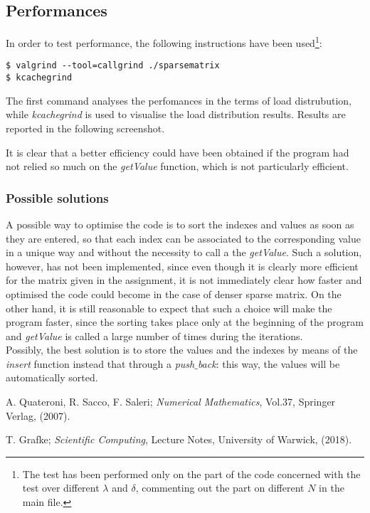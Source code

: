 \documentclass[11pt]{article}
\theoremstyle{theorem}
\theoremstyle{definition}
\begin{document}
\subsection{Performances}
\label{subsec:perf}
In order to test performance, the following instructions have been used\footnote{The test has been performed only on the part of the code concerned with the test over different $\lambda$ and $\delta$, commenting out the part on different $N$ in the main file. }:
\begin{verbatim}
$ valgrind --tool=callgrind ./sparsematrix
$ kcachegrind
\end{verbatim}

The first command analyses the perfomances in the terms of load distrubution, while \emph{kcachegrind} is used to visualise the load distribution results. Results are reported in the following screenshot.


It is clear that a better efficiency could have been obtained if the program had not relied so much on the \emph{getValue} function, which is not particularly efficient.\\

\subsubsection{Possible solutions}
A possible way to optimise the code is to sort the indexes and values as soon as they are entered, so that each index can be associated to the corresponding value in a unique way and without the necessity to call a the \emph{getValue}. Such a solution, however, has not been implemented, since even though it is clearly more efficient for the matrix given in the assignment, it is not immediately clear how faster and optimised the code could become in the case of denser sparse matrix. On the other hand, it is still reasonable to expect that such a choice will make the program faster, since the sorting takes place only at the beginning of the program and \emph{getValue} is called a large number of times during the iterations.\\
Possibly, the best solution is to store the values and the indexes by means of the \emph{insert} function instead that through a \emph{push$\_$back}: this way, the values
 will be automatically sorted.\\



\cleardoublepage
\begin{thebibliography}{99}

 A. Quateroni, R. Sacco, F. Saleri;
\emph{Numerical Mathematics}, Vol.37, Springer Verlag, (2007).

 T. Grafke;
\emph{Scientific Computing}, Lecture Notes, University of Warwick, (2018).







\printindex
\end{thebibliography}
\end{document}
